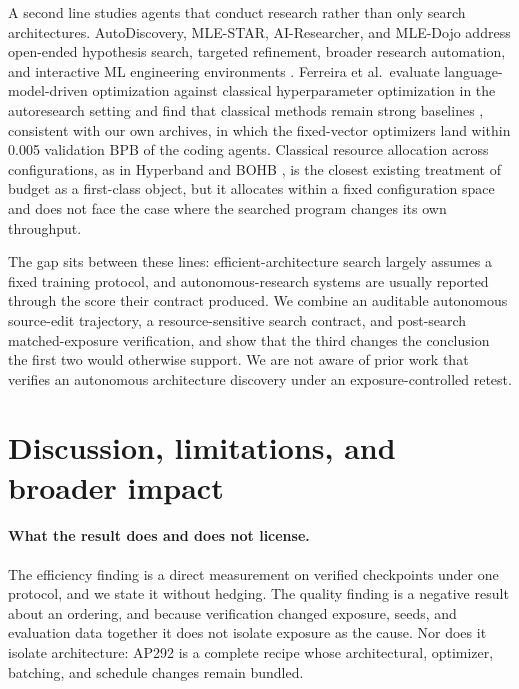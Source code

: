 \documentclass{article}
\begin{document}
A second line studies agents that conduct research rather than only search architectures. AutoDiscovery, MLE-STAR, AI-Researcher, and MLE-Dojo address open-ended hypothesis search, targeted refinement, broader research automation, and interactive ML engineering environments \citep{autodiscovery,mlestar,airesearcher,mledojo}. Ferreira et al.\ evaluate language-model-driven optimization against classical hyperparameter optimization in the autoresearch setting and find that classical methods remain strong baselines \citep{ferreira}, consistent with our own archives, in which the fixed-vector optimizers land within 0.005 validation BPB of the coding agents. Classical resource allocation across configurations, as in Hyperband and BOHB \citep{hyperband,bohb}, is the closest existing treatment of budget as a first-class object, but it allocates within a fixed configuration space and does not face the case where the searched program changes its own throughput.

The gap sits between these lines: efficient-architecture search largely assumes a fixed training protocol, and autonomous-research systems are usually reported through the score their contract produced. We combine an auditable autonomous source-edit trajectory, a resource-sensitive search contract, and post-search matched-exposure verification, and show that the third changes the conclusion the first two would otherwise support. We are not aware of prior work that verifies an autonomous architecture discovery under an exposure-controlled retest.

\section{Discussion, limitations, and broader impact}\label{sec:limits}
\paragraph{What the result does and does not license.} The efficiency finding is a direct measurement on verified checkpoints under one protocol, and we state it without hedging. The quality finding is a negative result about an ordering, and because verification changed exposure, seeds, and evaluation data together it does not isolate exposure as the cause. Nor does it isolate architecture: AP292 is a complete recipe whose architectural, optimizer, batching, and schedule changes remain bundled.
\end{document}
